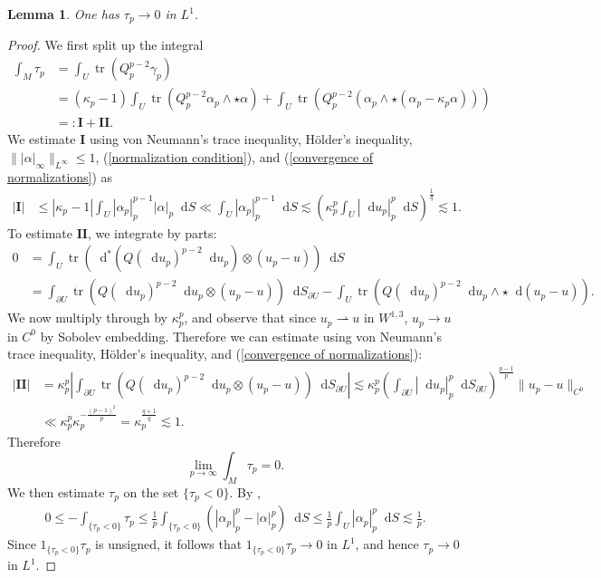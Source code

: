 \documentclass[reqno,11pt]{amsart}
\newcommand*\dif{\mathop{}\!\mathrm{d}}
\DeclareMathOperator{\tr}{tr}
\newtheorem{lemma}[theorem]{Lemma}
\newcommand{\weakto}{\rightharpoonup}
\theoremstyle{definition}
\numberwithin{equation}{section}
\begin{document}
\begin{lemma}\label{decay of tau}
One has $\tau_p \to 0$ in $L^1$.
\end{lemma}
\begin{proof}
We first split up the integral
\begin{align*}
\int_M \tau_p
&= \int_U \tr(Q_p^{p - 2} \gamma_p) \\
&= (\kappa_p - 1) \int_U \tr(Q_p^{p - 2} \alpha_p \wedge \star \alpha) + \int_U \tr(Q_p^{p - 2} (\alpha_p \wedge \star (\alpha_p - \kappa_p \alpha))) \\
&=: \mathbf I + \mathbf{II}.
\end{align*}
We estimate $\mathbf I$ using von Neumann's trace inequality, H\"older's inequality, $\||\alpha|_\infty\|_{L^\infty} \leq 1$, (\ref{normalization condition}), and (\ref{convergence of normalizations}) as 
\begin{align*}
|\mathbf I| &\leq |\kappa_p - 1| \int_U |\alpha_p|_p^{p - 1} |\alpha|_p \dif S \ll \int_U |\alpha_p|_p^{p - 1} \dif S \lesssim \left(\kappa_p^p \int_U |\dif u_p|_p^p \dif S\right)^{\frac{1}{q}} \lesssim 1.
\end{align*}
To estimate $\mathbf{II}$, we integrate by parts:
\begin{align*}
0 &= \int_U \tr(\dif^*(Q(\dif u_p)^{p - 2} \dif u_p) \otimes (u_p - u)) \dif S \\
&= \int_{\partial U} \tr(Q(\dif u_p)^{p - 2} \dif u_p \otimes (u_p - u)) \dif S_{\partial U} - \int_U \tr(Q(\dif u_p)^{p - 2} \dif u_p \wedge \star \dif (u_p - u)).
\end{align*}
We now multiply through by $\kappa_p^p$, and observe that since $u_p \weakto u$ in $W^{1, 3}$, $u_p \to u$ in $C^0$ by Sobolev embedding.
Therefore we can estimate using von Neumann's trace inequality, H\"older's inequality, and (\ref{convergence of normalizations}):
\begin{align*}
\left|\mathbf{II}\right| &= \kappa_p^p \left|\int_{\partial U} \tr(Q(\dif u_p)^{p - 2} \dif u_p \otimes (u_p - u)) \dif S_{\partial U}\right| 
\lesssim \kappa_p^p \left(\int_{\partial U} |\dif u_p|_p^p \dif S_{\partial U}\right)^{\frac{p - 1}{p}} \|u_p - u\|_{C^0} \\
&\ll \kappa_p^p \kappa_p^{-\frac{(p - 1)^2}{p}} = \kappa_p^{\frac{q + 1}{q}} \lesssim 1. 
\end{align*}
Therefore
$$\lim_{p \to \infty} \int_M \tau_p = 0.$$
We then estimate $\tau_p$ on the set $\{\tau_p < 0\}$.
By \cite[Proposition 2.3]{daskalopoulos2022analytic}, 
\begin{align*}
0 \leq -\int_{\{\tau_p < 0\}} \tau_p \leq \frac{1}{p} \int_{\{\tau_p < 0\}} (|\alpha_p|_p^p - |\alpha|_p^p) \dif S \leq \frac{1}{p} \int_U |\alpha_p|_p^p \dif S \lesssim \frac{1}{p}.
\end{align*}
Since $1_{\{\tau_p < 0\}} \tau_p$ is unsigned, it follows that $1_{\{\tau_p < 0\}} \tau_p \to 0$ in $L^1$, and hence $\tau_p \to 0$ in $L^1$.
\end{proof}
\end{document}
